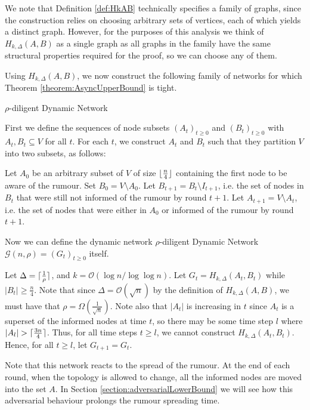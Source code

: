 We note that Definition \ref{def:HkAB} technically specifies a family of graphs, since the construction relies on choosing arbitrary sets of vertices, each of which yields a distinct graph. However, for the purposes of this analysis we think of $H_{k, \Delta}(A,B)$ as a single graph as all graphs in the family have the same structural properties required for the proof, so we can choose any of them.

Using $H_{k, \Delta}(A,B)$, we now construct the following family of networks for which Theorem \ref{theorem:AsyncUpperBound} is tight.

\begin{definition}
	$\rho$-diligent Dynamic Network
	
	First we define the sequences of node subsets $(A_t)_{t \geq 0}$ and $(B_t)_{t \geq 0}$ with $A_t, B_t \subseteq V$ for all $t$. For each $t$, we construct $A_t$ and $B_t$ such that they partition $V$ into two subsets, as follows:

	Let $A_0$ be an arbitrary subset of $V$ of size $\lfloor\frac{n}{4}\rfloor$ containing the first node to be aware of the rumour. 
	Set $B_0 = V \setminus A_0$. Let $B_{t+1} = B_t \setminus I_{t+1}$, i.e. the set of nodes in $B_t$ that were still not informed of the rumour by round $t+1$.
	Let $A_{t+1} = V \setminus A_t$, i.e. the set of nodes that were either in $A_0$ or informed of the rumour by round $t+1$.

	Now we can define the dynamic network $\rho$-diligent Dynamic Network $\mathcal{G}(n, \rho) = (G_t)_{t \geq 0}$ itself. 

	Let $\Delta = \lceil\frac{1}{\rho}\rceil$, and $k = \mathcal{O}(\log n / \log \log n)$.
	Let $G_t = H_{k, \Delta}(A_t, B_t)$ while $|B_t| \geq \frac{n}{4}$. Note that since $\Delta = \mathcal{O}(\sqrt{n})$ by the definition of $H_{k, \Delta}(A,B)$, we must have that $\rho = \Omega\left(\frac{1}{\sqrt{n}}\right)$.
	Note also that $|A_t|$ is increasing in $t$ since $A_t$ is a superset of the informed nodes at time $t$, so there may be some time step $l$ where $|A_l| > \lceil\frac{3n}{4}\rceil$. Thus, for all time steps $t \geq l$, we cannot construct $H_{k, \Delta}(A_t,B_t)$. Hence, for all $t \geq l$, let $G_{t+1} = G_t$.
\end{definition}

Note that this network reacts to the spread of the rumour. At the end of each round, when the topology is allowed to change, all the informed nodes are moved into the set $A$. In Section \ref{section:adversarialLowerBound} we will see how this adversarial behaviour prolongs the rumour spreading time.

